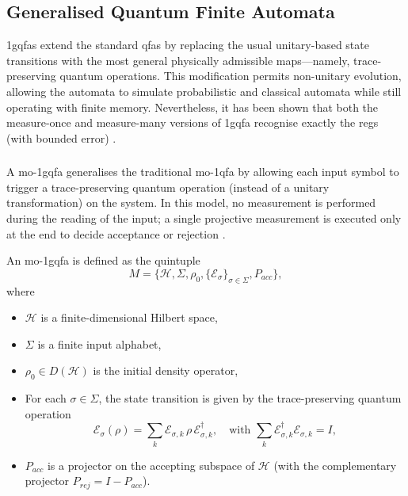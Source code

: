 \subsection{Generalised Quantum Finite Automata}
\label{sec:generalised-qfa}
\glspl{1gqfa} extend the standard \glspl{qfa} by replacing the usual unitary-based state transitions with the most general physically admissible maps—namely, trace-preserving quantum operations. This modification permits non-unitary evolution, allowing the automata to simulate probabilistic and classical automata while still operating with finite memory. Nevertheless, it has been shown that both the measure-once and measure-many versions of \gls{1gqfa} recognise exactly the \glspl{reg} (with bounded error) \cite{li2012characterizations}.

\subsubsection{}
A \gls{mo-1gqfa} generalises the traditional \gls{mo-1qfa} by allowing each input symbol to trigger a trace-preserving quantum operation (instead of a unitary transformation) on the system. In this model, no measurement is performed during the reading of the input; a single projective measurement is executed only at the end to decide acceptance or rejection \cite{li2012characterizations}.

\begin{definition}
An \gls{mo-1gqfa} is defined as the quintuple
\[
M = \{ \mathcal{H},\Sigma,\rho_0,\{\mathcal{E}_\sigma\}_{\sigma\in\Sigma},P_{acc}\},
\]
where
\begin{itemize}
  \item $\mathcal{H}$ is a finite-dimensional Hilbert space,
  \item $\Sigma$ is a finite input alphabet,
  \item $\rho_0\in D(\mathcal{H})$ is the initial density operator,
  \item For each $\sigma\in\Sigma$, the state transition is given by the trace-preserving quantum operation 
  \[
  \mathcal{E}_\sigma(\rho)=\sum_{k} \mathcal{E}_{\sigma,k}\,\rho\,\mathcal{E}_{\sigma,k}^\dagger,\quad \text{with } \sum_{k} \mathcal{E}_{\sigma,k}^\dagger \mathcal{E}_{\sigma,k}=I,
  \]
  \item $P_{acc}$ is a projector on the accepting subspace of $\mathcal{H}$ (with the complementary projector $P_{rej}=I-P_{acc}$).
\end{itemize}
\end{definition}

